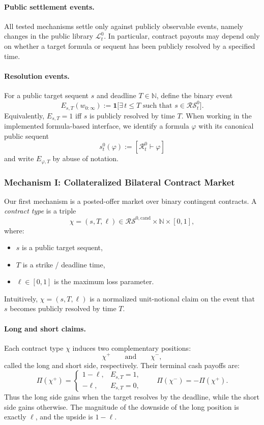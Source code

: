 \documentclass[letterpaper]{article} %
\renewcommand{\phi}{\varphi}
\newcommand{\proves}{\vdash}
\begin{document}
\paragraph{Public settlement events.}
All tested mechanisms settle only against publicly observable events, namely changes in the public library $\mathcal L^0_t$. In particular, contract payouts may depend only on whether a target formula or sequent has been publicly resolved by a specified time.


\paragraph{Resolution events.}
For a public target sequent $s$ and deadline $T\in\mathbb N$, define the binary event
\[
E_{s,T}(w_{0:\infty}) := \mathbf 1\big[\exists\, t\le T \text{ such that } s\in \mathcal{RS}^0_t\big].
\]
Equivalently, $E_{s,T}=1$ iff $s$ is publicly resolved by time $T$.
When working in the implemented formula-based interface, we identify a formula $\phi$ with its canonical public sequent
\[
s^0_t(\phi):=[\mathcal R^0_t\proves \phi]
\]
and write $E_{\phi,T}$ by abuse of notation.




\subsubsection{Mechanism I: Collateralized Bilateral Contract Market}

Our first mechanism is a posted-offer market over binary contingent contracts. A \emph{contract type} is a triple
\[
\chi=(s,T,\ell)\in \mathcal{RS}^{0,\mathrm{cand}}\times \mathbb N \times [0,1],
\]
where:
\begin{itemize}
    \item $s$ is a public target sequent,
    \item $T$ is a strike / deadline time,
    \item $\ell\in[0,1]$ is the maximum loss parameter.
\end{itemize}

Intuitively, $\chi=(s,T,\ell)$ is a normalized unit-notional claim on the event that $s$ becomes publicly resolved by time $T$.

\paragraph{Long and short claims.}
Each contract type $\chi$ induces two complementary positions:
\[
\chi^{+} \qquad\text{and}\qquad \chi^{-},
\]
called the long and short side, respectively. Their terminal cash payoffs are:
\[
\Pi(\chi^+) =
\begin{cases}
1-\ell, & E_{s,T}=1,\\
-\ell, & E_{s,T}=0,
\end{cases}
\qquad
\Pi(\chi^-) = -\Pi(\chi^+).
\]
Thus the long side gains when the target resolves by the deadline, while the short side gains otherwise. The magnitude of the downside of the long position is exactly $\ell$, and the upside is $1-\ell$.
\end{document}
